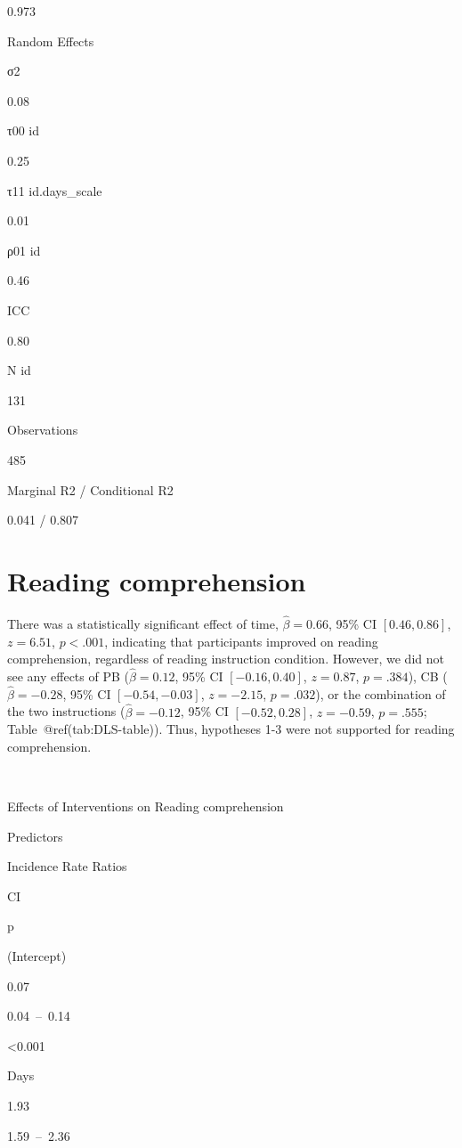 \documentclass[
]{article}
\begin{document}
0.973

Random Effects

σ2

0.08

τ00 id

0.25

τ11 id.days\_scale

0.01

ρ01 id

0.46

ICC

0.80

N id

131

Observations

485

Marginal R2 / Conditional R2

0.041 / 0.807

\hypertarget{reading-comprehension-1}{%
\section{Reading comprehension}\label{reading-comprehension-1}}

There was a statistically significant effect of time,
\(\hat{\beta} = 0.66\), 95\% CI \([0.46, 0.86]\), \(z = 6.51\),
\(p < .001\), indicating that participants improved on reading
comprehension, regardless of reading instruction condition. However, we
did not see any effects of PB (\(\hat{\beta} = 0.12\), 95\% CI
\([-0.16, 0.40]\), \(z = 0.87\), \(p = .384\)), CB
(\(\hat{\beta} = -0.28\), 95\% CI \([-0.54, -0.03]\), \(z = -2.15\),
\(p = .032\)), or the combination of the two instructions
(\(\hat{\beta} = -0.12\), 95\% CI \([-0.52, 0.28]\), \(z = -0.59\),
\(p = .555\); Table~@ref(tab:DLS-table)). Thus, hypotheses 1-3 were not
supported for reading comprehension.

~

Effects of Interventions on Reading comprehension

Predictors

Incidence Rate Ratios

CI

p

(Intercept)

0.07

0.04~--~0.14

\textless0.001

Days

1.93

1.59~--~2.36
\end{document}
